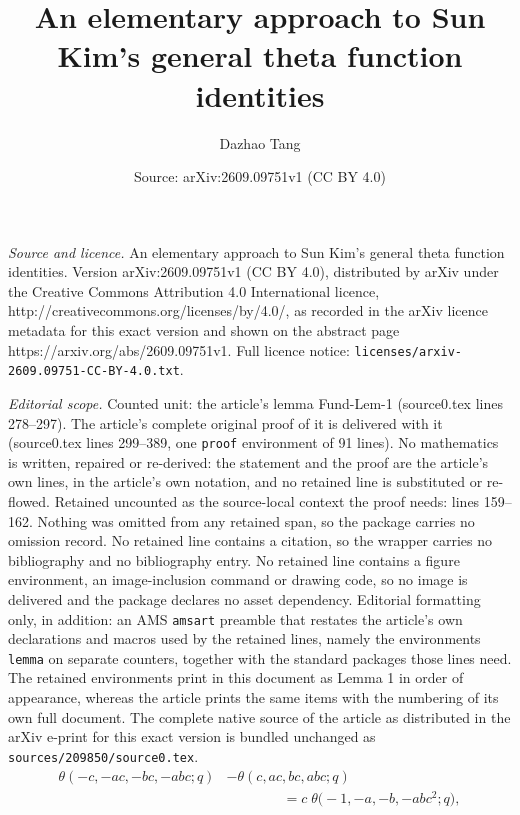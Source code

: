 \documentclass[10pt,a4paper]{amsart}
\title{An elementary approach to Sun Kim's general theta function identities}
\author{Dazhao Tang}
\date{Source: arXiv:2609.09751v1 (CC BY 4.0)}
\begin{document}
\maketitle

\noindent\emph{Source and licence.} An elementary approach to Sun Kim's general theta function identities. Version arXiv:2609.09751v1 (CC BY 4.0), distributed by arXiv under the Creative Commons Attribution 4.0 International licence, http://creativecommons.org/licenses/by/4.0/, as recorded in the arXiv licence metadata for this exact version and shown on the abstract page https://arxiv.org/abs/2609.09751v1. Full licence notice: \texttt{licenses/arxiv-2609.09751-CC-BY-4.0.txt}.\par\smallskip

\noindent\textit{Editorial scope.} Counted unit: the article's lemma Fund-Lem-1 (source0.tex lines 278--297). The article's complete original proof of it is delivered with it (source0.tex lines 299--389, one \texttt{proof} environment of 91 lines). No mathematics is written, repaired or re-derived: the statement and the proof are the article's own lines, in the article's own notation, and no retained line is substituted or re-flowed.  Retained uncounted as the source-local context the proof needs: lines 159--162.  Nothing was omitted from any retained span, so the package carries no omission record.  No retained line contains a citation, so the wrapper carries no bibliography and no bibliography entry.  No retained line contains a figure environment, an image-inclusion command or drawing code, so no image is delivered and the package declares no asset dependency.  Editorial formatting only, in addition: an AMS \texttt{amsart} preamble that restates the article's own declarations and macros used by the retained lines, namely the environments \texttt{lemma} on separate counters, together with the standard packages those lines need.  The retained environments print in this document as Lemma 1 in order of appearance, whereas the article prints the same items with the numbering of its own full document.  The complete native source of the article as distributed in the arXiv e-print for this exact version is bundled unchanged as \texttt{sources/209850/source0.tex}.
\begin{align}
\theta(-c,-ac,-bc,-abc;q) &-\theta(c,ac,bc,abc;q)\nonumber\\
 &\qquad\qquad=c\!\;\theta\big({-}1,-a,-b,-abc^2;q\big),\label{War-gene}
\end{align}
\end{document}

